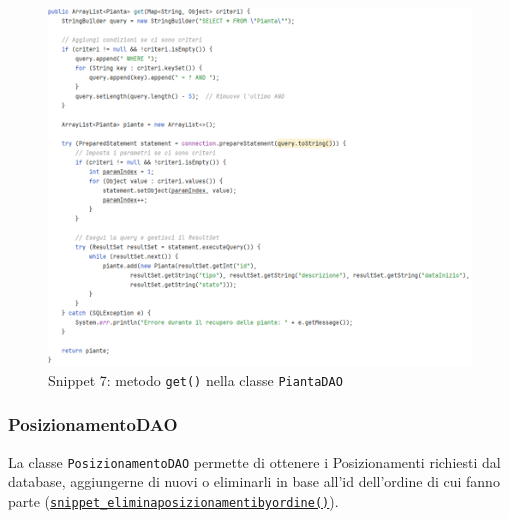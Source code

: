 \documentclass{article}
\newcommand{\code}[1]{\texttt{#1}}
\begin{document}
\begin{figure}[H]
    \centering
    \includegraphics[scale=0.5]{resources/images/Snippets/snippet_piantaDAOget.png}
    \captionsetup{labelformat=empty,labelsep=none}
    \caption{Snippet 7: metodo \code{get()} nella classe \code{PiantaDAO}}
    \label{fig:snippet_piantaDAOget}
\end{figure}

\newpage

\subsubsection{PosizionamentoDAO}
La classe \code{PosizionamentoDAO} permette di ottenere i Posizionamenti richiesti dal database, aggiungerne di nuovi o eliminarli in base all'id dell'ordine di cui fanno parte (\hyperref[fig:snippet_eliminaposizionamentibyordine]{\code{snippet\_eliminaposizionamentibyordine()}}).
\end{document}
